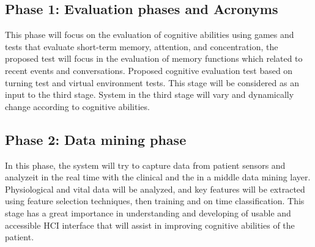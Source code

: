 \subsection {Phase 1: Evaluation phases and Acronyms}
This phase will focus on the evaluation of cognitive abilities using games and tests that evaluate short-term memory, attention, and concentration, the proposed test will focus in the evaluation of memory functions which related to recent events and conversations.
Proposed cognitive evaluation test based on turning test and virtual environment tests. This stage will be considered as an input to the third stage. System in the third stage will vary and dynamically change according to cognitive abilities.
\subsection{Phase 2: Data mining phase}
In this phase, the system will try to capture data from patient sensors and analyzeit in the real time with the clinical and the in a middle data mining layer. Physiological and vital data will be analyzed, and key features will be extracted using feature selection techniques, then training and on time classification. This stage has a great importance in understanding and developing of usable and accessible HCI interface that will assist in improving cognitive abilities of the patient.
